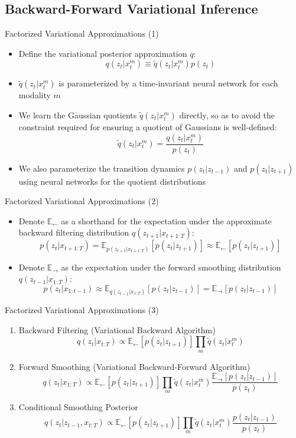 \documentclass{beamer}
\begin{document}
\subsection{Backward-Forward Variational Inference}
\begin{frame}{Factorized Variational Approximations (1)}
\begin{itemize}
\item Define the variational posterior approximation $q$:\[
q(z_t|x_t^m)\equiv\tilde{q}(z_t|x_t^m)p(z_t)
\]
\item $\tilde{q}(z_t|x_t^m)$ is parameterized by a time-invariant neural network for each modality $m$
\item We learn the Gaussian quotients $\tilde{q}(z_t|x_t^m)$ directly, so as to avoid the constraint required for ensuring a quotient of Gaussians is well-defined:\[
\tilde{q}(z_t|x_t^m)=\frac{q(z_t|x_t^m)}{p(z_t)}
\]
\item We also parameterize the transition dynamics $p(z_t|z_{t-1})$ and $p(z_t|z_{t+1})$ using neural networks for the quotient distributions
\end{itemize}
\end{frame}
\begin{frame}{Factorized Variational Approximations (2)}
\begin{itemize}
\item Denote $\mathbb{E}_\leftarrow$ as a shorthand for the expectation under the approximate backward filtering distribution $q(z_{t+1}|x_{t+1:T})$:\[
p(z_t|x_{t+1:T})=\mathbb{E}_{p(z_{t+1}|x_{t+1:T})}[p(z_t|z_{t+1})]\approx\mathbb{E}_\leftarrow[p(z_t|z_{t+1})]
\]
\item Denote $\mathbb{E}_\to$ as the expectation under the forward smoothing distribution $q(z_{t-1}|x_{1:T})$:\[
p(z_t|x_{1:t-1})\approx\mathbb{E}_{q(z_{t-1}|x_{1:T})}[p(z_t|z_{t-1})]=\mathbb{E}_\to[p(z_t|z_{t-1})]
\]
\end{itemize}
\end{frame}
\begin{frame}{Factorized Variational Approximations (3)}
\begin{enumerate}
\item Backward Filtering (Variational Backward Algorithm)\[
q(z_t|x_{t:T})\propto\mathbb{E}_\leftarrow[p(z_t|z_{t+1})]\prod_m\tilde{q}(z_t|x_t^m)
\]
\item Forward Smoothing (Variational Backward-Forward Algorithm)\[
q(z_t|x_{1:T})\propto\mathbb{E}_\leftarrow[p(z_t|z_{t+1})]\prod_m\tilde{q}(z_t|x_t^m)\frac{\mathbb{E}_\to[p(z_t|z_{t-1})]}{p(z_t)}
\]
\item Conditional Smoothing Posterior\[
q(z_t|z_{t-1},x_{t:T})\propto\mathbb{E}_\leftarrow[p(z_t|z_{t+1})]\prod_m\tilde{q}(z_t|x_t^m)\frac{p(z_t|z_{t-1})}{p(z_t)}
\]
\end{enumerate}
\end{frame}
\end{document}
